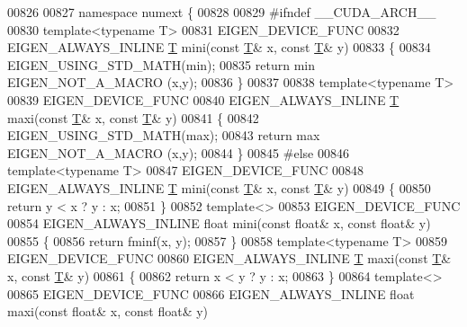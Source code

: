 \begin{DoxyCode}
00826 
00827 \textcolor{keyword}{namespace }numext \{
00828 
00829 \textcolor{preprocessor}{#ifndef \_\_CUDA\_ARCH\_\_}
00830 \textcolor{keyword}{template}<\textcolor{keyword}{typename} T>
00831 EIGEN\_DEVICE\_FUNC
00832 EIGEN\_ALWAYS\_INLINE \hyperlink{group___sparse_core___module_class_eigen_1_1_triplet}{T} mini(\textcolor{keyword}{const} \hyperlink{group___sparse_core___module_class_eigen_1_1_triplet}{T}& x, \textcolor{keyword}{const} \hyperlink{group___sparse_core___module_class_eigen_1_1_triplet}{T}& y)
00833 \{
00834   EIGEN\_USING\_STD\_MATH(min);
00835   \textcolor{keywordflow}{return} min EIGEN\_NOT\_A\_MACRO (x,y);
00836 \}
00837 
00838 \textcolor{keyword}{template}<\textcolor{keyword}{typename} T>
00839 EIGEN\_DEVICE\_FUNC
00840 EIGEN\_ALWAYS\_INLINE \hyperlink{group___sparse_core___module_class_eigen_1_1_triplet}{T} maxi(\textcolor{keyword}{const} \hyperlink{group___sparse_core___module_class_eigen_1_1_triplet}{T}& x, \textcolor{keyword}{const} \hyperlink{group___sparse_core___module_class_eigen_1_1_triplet}{T}& y)
00841 \{
00842   EIGEN\_USING\_STD\_MATH(max);
00843   \textcolor{keywordflow}{return} max EIGEN\_NOT\_A\_MACRO (x,y);
00844 \}
00845 \textcolor{preprocessor}{#else}
00846 \textcolor{keyword}{template}<\textcolor{keyword}{typename} T>
00847 EIGEN\_DEVICE\_FUNC
00848 EIGEN\_ALWAYS\_INLINE \hyperlink{group___sparse_core___module_class_eigen_1_1_triplet}{T} mini(\textcolor{keyword}{const} \hyperlink{group___sparse_core___module_class_eigen_1_1_triplet}{T}& x, \textcolor{keyword}{const} \hyperlink{group___sparse_core___module_class_eigen_1_1_triplet}{T}& y)
00849 \{
00850   \textcolor{keywordflow}{return} y < x ? y : x;
00851 \}
00852 \textcolor{keyword}{template}<>
00853 EIGEN\_DEVICE\_FUNC
00854 EIGEN\_ALWAYS\_INLINE \textcolor{keywordtype}{float} mini(\textcolor{keyword}{const} \textcolor{keywordtype}{float}& x, \textcolor{keyword}{const} \textcolor{keywordtype}{float}& y)
00855 \{
00856   \textcolor{keywordflow}{return} fminf(x, y);
00857 \}
00858 \textcolor{keyword}{template}<\textcolor{keyword}{typename} T>
00859 EIGEN\_DEVICE\_FUNC
00860 EIGEN\_ALWAYS\_INLINE \hyperlink{group___sparse_core___module_class_eigen_1_1_triplet}{T} maxi(\textcolor{keyword}{const} \hyperlink{group___sparse_core___module_class_eigen_1_1_triplet}{T}& x, \textcolor{keyword}{const} \hyperlink{group___sparse_core___module_class_eigen_1_1_triplet}{T}& y)
00861 \{
00862   \textcolor{keywordflow}{return} x < y ? y : x;
00863 \}
00864 \textcolor{keyword}{template}<>
00865 EIGEN\_DEVICE\_FUNC
00866 EIGEN\_ALWAYS\_INLINE \textcolor{keywordtype}{float} maxi(\textcolor{keyword}{const} \textcolor{keywordtype}{float}& x, \textcolor{keyword}{const} \textcolor{keywordtype}{float}& y)

\end{DoxyCode}

